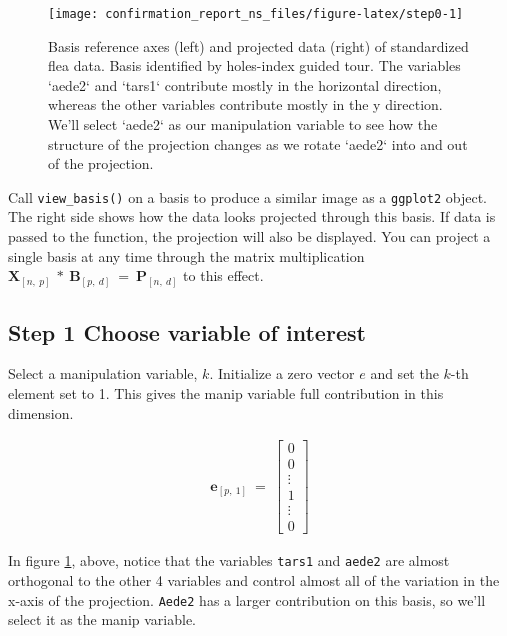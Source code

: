 \documentclass{monashthesis}
\begin{document}
\begin{figure}

{\centering \texttt{[image: confirmation\_report\_ns\_files/figure-latex/step0-1]} 

}

\caption{Basis reference axes (left) and projected data (right) of standardized flea data. Basis identified by holes-index guided tour. The variables `aede2` and `tars1` contribute mostly in the horizontal direction, whereas the other variables contribute mostly in the y direction. We'll select `aede2` as our manipulation variable to see how the structure of the projection changes as we rotate `aede2` into and out of the projection.}\label{fig:step0}
\end{figure}

Call \texttt{view\_basis()} on a basis to produce a similar image as a
\texttt{ggplot2} object. The right side shows how the data looks
projected through this basis. If data is passed to the function, the
projection will also be displayed. You can project a single basis at any
time through the matrix multiplication
\(\textbf{X}_{[n,~p]} ~*~ \textbf{B}_{[p,~d]} ~=~ \textbf{P}_{[n,~d]}\)
to this effect.

\subsection{Step 1 Choose variable of
interest}\label{step-1-choose-variable-of-interest-1}

Select a manipulation variable, \(k\). Initialize a zero vector \(e\)
and set the \(k\)-th element set to 1. This gives the manip variable
full contribution in this dimension.

\begin{align*}
\textbf{e}_{[p,~1]} ~=~
  \begin{bmatrix}
    0 \\
    0 \\
    \vdots \\
    1 \\
    \vdots \\
    0
  \end{bmatrix}
\end{align*}

In figure \ref{fig:step0}, above, notice that the variables
\texttt{tars1} and \texttt{aede2} are almost orthogonal to the other 4
variables and control almost all of the variation in the x-axis of the
projection. \texttt{Aede2} has a larger contribution on this basis, so
we'll select it as the manip variable.
\end{document}
